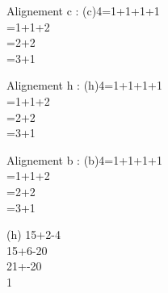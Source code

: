 \documentclass{article}
\begin{document}
Alignement c :
\autoaligne(c){4=1+1+1+1\\=1+1+2\\=2+2\\=3+1}
\medbreak

Alignement h :
\autoaligne(h){4=1+1+1+1\\=1+1+2\\=2+2\\=3+1}
\medbreak

Alignement b :
\autoaligne(b){4=1+1+1+1\\=1+1+2\\=2+2\\=3+1}

\autoaligne[*c](h){
15+2-4\\
15+6-20\\
21+-20\\
1}
\end{document}

